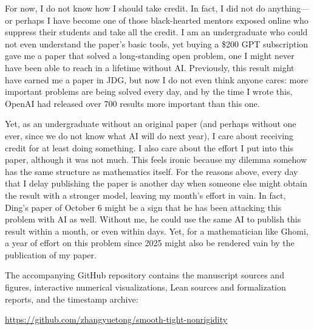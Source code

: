 For now, I do not know how I should take credit. In fact, I did not
do anything---or perhaps I have become one of those black-hearted
mentors exposed online who suppress their students and take all the
credit. I am an undergraduate who could not even understand the paper's
basic tools, yet buying a \$200 GPT subscription gave me a paper that
solved a long-standing open problem, one I might never have been able
to reach in a lifetime without AI. Previously, this result might have
earned me a paper in JDG, but now I do not even think anyone cares:
more important problems are being solved every day, and by the time
I wrote this, OpenAI had released over 700 results more important than
this one.

Yet, as an undergraduate without an original paper (and perhaps without
one ever, since we do not know what AI will do next year), I care about
receiving credit for at least doing something. I also care about the
effort I put into this paper, although it was not much. This feels
ironic because my dilemma somehow has the same structure as mathematics
itself. For the reasons above, every day that I delay publishing the
paper is another day when someone else might obtain the result with
a stronger model, leaving my month's effort in vain. In fact, Ding's
paper of October 6 might be a sign that he has been attacking this
problem with AI as well. Without me, he could use the same AI to
publish this result within a month, or even within days. Yet, for
a mathematician like Ghomi, a year of effort on this problem since
2025 might also be rendered vain by the publication of my paper.

The accompanying GitHub repository contains the manuscript sources and
figures, interactive numerical visualizations, Lean sources and
formalization reports, and the timestamp archive:

\noindent\url{https://github.com/zhangyuetong/smooth-tight-nonrigidity}
